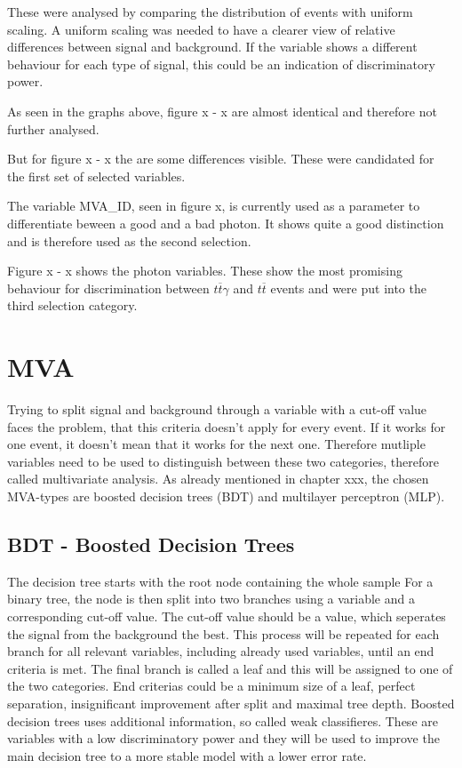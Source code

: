 \documentclass[11pt]{scrartcl}
\begin{document}
These were analysed by comparing the distribution of events with uniform scaling. A uniform scaling was needed to have a clearer view of relative differences between signal and background. If the variable shows a different behaviour for each type of signal, this could be an indication of discriminatory power. 

As seen in the graphs above, figure x - x are almost identical and therefore not further analysed.

But for figure x - x the are some differences visible. These were candidated for the first set of selected variables. 

The variable MVA\_ID, seen in figure x, is currently used as a parameter to differentiate beween a good and a bad photon. It shows quite a good distinction and is therefore used as the second selection.

Figure x - x shows the photon variables. These show the most promising behaviour for discrimination between $t\overline{t}\gamma$ and $t\overline{t}$ events and were put into the third selection category.

\section{MVA}

Trying to split signal and background through a variable with a cut-off value faces the problem, that this criteria doesn't apply for every event. If it works for one event, it doesn't mean that it works for the next one. Therefore mutliple variables need to be used to distinguish between these two categories, therefore called multivariate analysis. As already mentioned in chapter xxx, the chosen MVA-types are boosted decision trees (BDT) and multilayer perceptron (MLP).

	\subsection{BDT - Boosted Decision Trees}
	The decision tree starts with the root node containing the whole sample For a binary tree, the node is then split into two branches using a variable and a corresponding cut-off value. The cut-off value should be a value, which seperates the signal from the background the best. This process will be repeated for each branch for all relevant variables, including already used variables, until an end criteria is met. The final branch is called a leaf and this will be assigned to one of the two categories. End criterias could be a minimum size of a leaf, perfect separation, insignificant improvement after split and maximal tree depth. Boosted decision trees uses additional information, so called weak classifieres. These are variables with a low discriminatory power and they will be used to improve the main decision tree to a more stable model with a lower error rate. 
	
\end{document}
